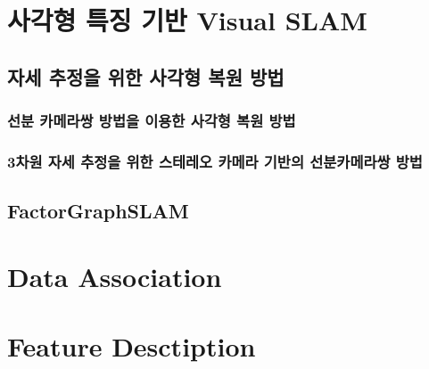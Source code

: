 \documentclass[master,korean,final]{cbnu-ecs}
\begin{document}
\chapter{사각형 특징 기반 Visual SLAM}
\section{자세 추정을 위한 사각형 복원 방법}
\cite{Guerrero2008}%
\cite{Nister2005}%

\cite{Lee2012,Lee2013}
\cite{Lee2014}
\subsection{선분 카메라쌍 방법을 이용한 사각형 복원 방법}
\subsection{3차원 자세 추정을 위한 스테레오 카메라 기반의 선분카메라쌍 방법}
\section{FactorGraphSLAM}
\cite{Dellaert2006}%

\chapter{Data Association}
\chapter{Feature Desctiption}
\end{document}
